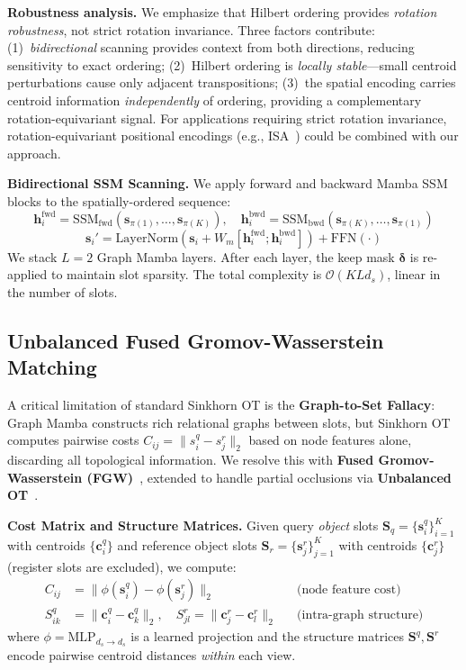 \documentclass{article}
\begin{document}
\textbf{Robustness analysis.}
We emphasize that Hilbert ordering provides \textit{rotation robustness}, not strict rotation invariance. Three factors contribute: (1)~\textit{bidirectional} scanning provides context from both directions, reducing sensitivity to exact ordering; (2)~Hilbert ordering is \textit{locally stable}---small centroid perturbations cause only adjacent transpositions; (3)~the spatial encoding carries centroid information \textit{independently} of ordering, providing a complementary rotation-equivariant signal. For applications requiring strict rotation invariance, rotation-equivariant positional encodings (e.g., ISA~\cite{isa2023}) could be combined with our approach.

\textbf{Bidirectional SSM Scanning.}
We apply forward and backward Mamba SSM blocks to the spatially-ordered sequence:
\begin{equation}
    \mathbf{h}_i^{\text{fwd}} = \text{SSM}_\text{fwd}(\mathbf{s}_{\pi(1)}, \ldots, \mathbf{s}_{\pi(K)}), \quad
    \mathbf{h}_i^{\text{bwd}} = \text{SSM}_\text{bwd}(\mathbf{s}_{\pi(K)}, \ldots, \mathbf{s}_{\pi(1)})
\end{equation}
\begin{equation}
    \mathbf{s}_i' = \text{LayerNorm}\!\left(\mathbf{s}_i + W_m [\mathbf{h}_i^{\text{fwd}}; \mathbf{h}_i^{\text{bwd}}]\right) + \text{FFN}(\cdot)
\end{equation}
We stack $L=2$ Graph Mamba layers. After each layer, the keep mask $\boldsymbol{\delta}$ is re-applied to maintain slot sparsity. The total complexity is $\mathcal{O}(KLd_s)$, linear in the number of slots.

\subsection{Unbalanced Fused Gromov-Wasserstein Matching}\label{sec:ot}

A critical limitation of standard Sinkhorn OT is the \textbf{Graph-to-Set Fallacy}: Graph Mamba constructs rich relational graphs between slots, but Sinkhorn OT computes pairwise costs $C_{ij} = \|s_i^q - s_j^r\|_2$ based on node features alone, discarding all topological information. We resolve this with \textbf{Fused Gromov-Wasserstein (FGW)}~\cite{titouan2019fgw}, extended to handle partial occlusions via \textbf{Unbalanced OT}~\cite{chizat2018uot}.

\textbf{Cost Matrix and Structure Matrices.}
Given query \textit{object} slots $\mathbf{S}_q = \{\mathbf{s}_i^q\}_{i=1}^K$ with centroids $\{\mathbf{c}_i^q\}$ and reference object slots $\mathbf{S}_r = \{\mathbf{s}_j^r\}_{j=1}^K$ with centroids $\{\mathbf{c}_j^r\}$ (register slots are excluded), we compute:
\begin{align}
    C_{ij} &= \|\phi(\mathbf{s}_i^q) - \phi(\mathbf{s}_j^r)\|_2 & &\text{(node feature cost)} \\
    S^q_{ik} &= \|\mathbf{c}_i^q - \mathbf{c}_k^q\|_2, \quad S^r_{jl} = \|\mathbf{c}_j^r - \mathbf{c}_l^r\|_2 & &\text{(intra-graph structure)}
\end{align}
where $\phi = \text{MLP}_{d_s \to d_s}$ is a learned projection and the structure matrices $\mathbf{S}^q, \mathbf{S}^r$ encode pairwise centroid distances \textit{within} each view.
\end{document}
